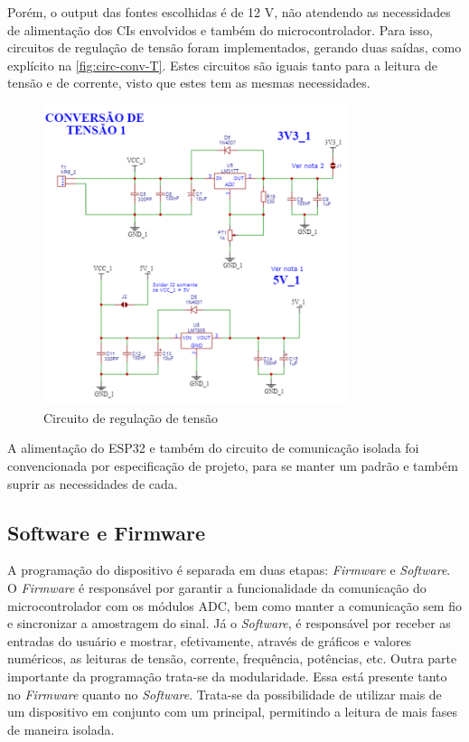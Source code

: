 Porém, o output das fontes escolhidas é de 12 V, não atendendo as necessidades de alimentação dos \gls{CI}s envolvidos e também do microcontrolador. Para isso, circuitos de regulação de tensão foram implementados, gerando duas saídas, como explícito na \autoref{fig:circ-conv-T}. Estes circuitos são iguais tanto para a leitura de tensão e de corrente, visto que estes tem as mesmas necessidades.

\begin{figure}[htb!]
    \caption{Circuito de regulação de tensão}
    \label{fig:circ-conv-T}
    \includegraphics[width=0.8\textwidth]{figuras/circ-conv-T.png}
    \fonte{}
\end{figure}

A alimentação do ESP32 e também do circuito de comunicação isolada foi convencionada por especificação de projeto, para se manter um padrão e também suprir as necessidades de cada.

\subsection{Software e Firmware}\label{softfirm}

A programação do dispositivo é separada em duas etapas: \textit{Firmware} e \textit{Software}. O \textit{Firmware} é responsável por garantir a funcionalidade da comunicação do microcontrolador com os módulos \gls{ADC}, bem como manter a comunicação sem fio e sincronizar a amostragem do sinal.
Já o \textit{Software}, é responsável por receber as entradas do usuário e mostrar, efetivamente, através de gráficos e valores numéricos, as leituras de tensão, corrente, frequência, potências, etc.
Outra parte importante da programação trata-se da modularidade. Essa está presente tanto no \textit{Firmware} quanto no \textit{Software}. Trata-se da possibilidade de utilizar mais de um dispositivo em conjunto com um principal, permitindo a leitura de mais fases de maneira isolada.


